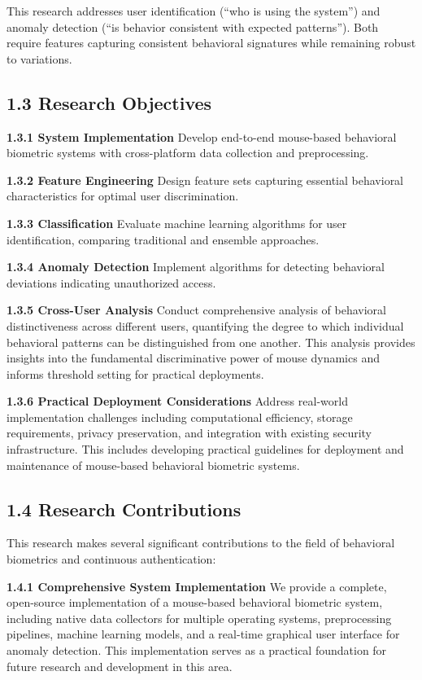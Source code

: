 \documentclass[
  11pt,
  a4paper,
]{article}
\begin{document}
This research addresses user identification (``who is using the
system'') and anomaly detection (``is behavior consistent with expected
patterns''). Both require features capturing consistent behavioral
signatures while remaining robust to variations.

\subsection{1.3 Research Objectives}\label{research-objectives}

\textbf{1.3.1 System Implementation} Develop end-to-end mouse-based
behavioral biometric systems with cross-platform data collection and
preprocessing.

\textbf{1.3.2 Feature Engineering} Design feature sets capturing
essential behavioral characteristics for optimal user discrimination.

\textbf{1.3.3 Classification} Evaluate machine learning algorithms for
user identification, comparing traditional and ensemble approaches.

\textbf{1.3.4 Anomaly Detection} Implement algorithms for detecting
behavioral deviations indicating unauthorized access.

\textbf{1.3.5 Cross-User Analysis} Conduct comprehensive analysis of
behavioral distinctiveness across different users, quantifying the
degree to which individual behavioral patterns can be distinguished from
one another. This analysis provides insights into the fundamental
discriminative power of mouse dynamics and informs threshold setting for
practical deployments.

\textbf{1.3.6 Practical Deployment Considerations} Address real-world
implementation challenges including computational efficiency, storage
requirements, privacy preservation, and integration with existing
security infrastructure. This includes developing practical guidelines
for deployment and maintenance of mouse-based behavioral biometric
systems.

\subsection{1.4 Research Contributions}\label{research-contributions}

This research makes several significant contributions to the field of
behavioral biometrics and continuous authentication:

\textbf{1.4.1 Comprehensive System Implementation} We provide a
complete, open-source implementation of a mouse-based behavioral
biometric system, including native data collectors for multiple
operating systems, preprocessing pipelines, machine learning models, and
a real-time graphical user interface for anomaly detection. This
implementation serves as a practical foundation for future research and
development in this area.
\end{document}
